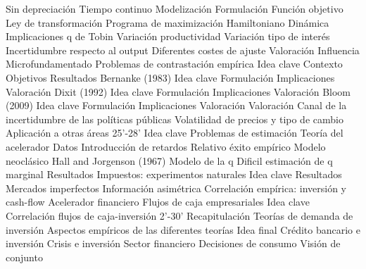 \documentclass{nuevotema}
\begin{document}
\begin{esquema}[enumerate]
			\3 Sin depreciación
			\3 Tiempo continuo
			\3 Modelización
		\2 Formulación
			\3 Función objetivo
			\3 Ley de transformación
			\3 Programa de maximización
			\3 Hamiltoniano
			\3 Dinámica
		\2 Implicaciones
			\3 q de Tobin
			\3 Variación productividad
			\3 Variación tipo de interés
			\3 Incertidumbre respecto al output
			\3 Diferentes costes de ajuste
		\2 Valoración
			\3 Influencia
			\3 Microfundamentado
			\3 Problemas de contrastación empírica
	\1 
		\2 Idea clave
			\3 Contexto
			\3 Objetivos
			\3 Resultados
		\2 Bernanke (1983)
			\3 Idea clave
			\3 Formulación
			\3 Implicaciones
			\3 Valoración
		\2 Dixit (1992)
			\3 Idea clave
			\3 Formulación
			\3 Implicaciones
			\3 Valoración
		\2 Bloom (2009)
			\3 Idea clave
			\3 Formulación
			\3 Implicaciones
			\3 Valoración
		\2 Valoración
			\3 Canal de la incertidumbre de las políticas públicas
			\3 Volatilidad de precios y tipo de cambio
			\3 Aplicación a otras áreas
	\1  25'-28'
		\2 Idea clave
			\3 Problemas de estimación
		\2 Teoría del acelerador
			\3 Datos
			\3 Introducción de retardos
			\3 Relativo éxito empírico
		\2 Modelo neoclásico
			\3 Hall and Jorgenson (1967)
		\2 Modelo de la q
			\3 Dificil estimación de q marginal
			\3 Resultados
		\2 Impuestos: experimentos naturales
			\3 Idea clave
			\3 Resultados
		\2 Mercados imperfectos
			\3 Información asimétrica
			\3 Correlación empírica: inversión y cash-flow
			\3 Acelerador financiero
		\2 Flujos de caja empresariales
			\3 Idea clave
			\3 Correlación flujos de caja-inversión
	\1[]  2'-30'
		\2 Recapitulación
			\3 Teorías de demanda de inversión
			\3 Aspectos empíricos de las diferentes teorías
		\2 Idea final
			\3 Crédito bancario e inversión
			\3 Crisis e inversión
			\3 Sector financiero
			\3 Decisiones de consumo
			\3 Visión de conjunto

\end{esquema}

\esquemalargo
\end{document}
